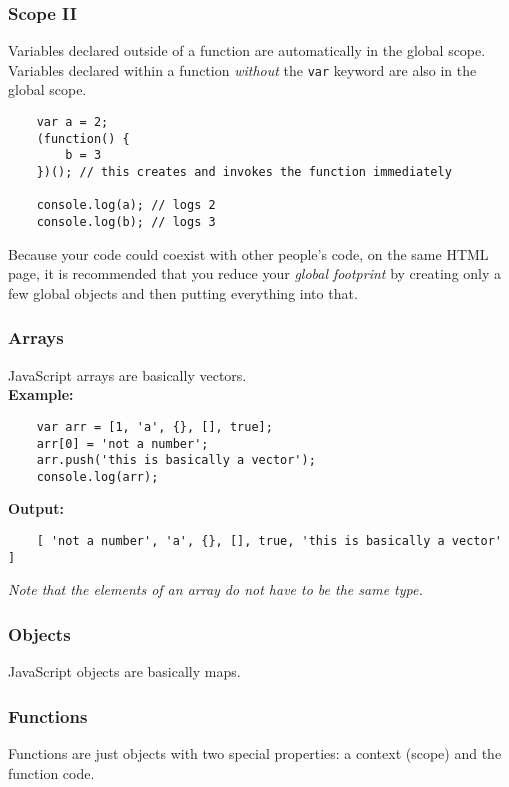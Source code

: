 \documentclass{lug}
\begin{document}
\begin{frame}[fragile]
    \frametitle{Scope II}

    Variables declared outside of a function are automatically in the global scope.\\

    Variables declared within a function \textit{without} the \texttt{var} keyword are also in the
    global scope.

    \begin{lstlisting}
    var a = 2;
    (function() {
        b = 3
    })(); // this creates and invokes the function immediately

    console.log(a); // logs 2
    console.log(b); // logs 3
    \end{lstlisting}

    Because your code could coexist with other people's code, on the same HTML page, it is
    recommended that you reduce your \textit{global footprint} by creating only a few global objects
    and then putting everything into that.
\end{frame}

\begin{frame}[fragile]
    \frametitle{Arrays}

    JavaScript arrays are basically vectors.\\

    \textbf{Example:}

    \begin{lstlisting}
    var arr = [1, 'a', {}, [], true];
    arr[0] = 'not a number';
    arr.push('this is basically a vector');
    console.log(arr);
    \end{lstlisting}

    \textbf{Output:}

    \begin{lstlisting}
    [ 'not a number', 'a', {}, [], true, 'this is basically a vector' ]
    \end{lstlisting}

    \textit{Note that the elements of an array do not have to be the same type.}

\end{frame}

\begin{frame}
    \frametitle{Objects}

    JavaScript objects are basically maps.
\end{frame}

\begin{frame}
    \frametitle{Functions}

    Functions are just objects with two special properties: a context (scope) and the function code.
\end{frame}
\end{document}
